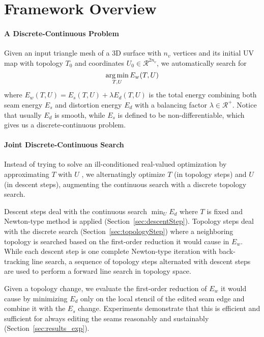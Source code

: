 
\section{Framework Overview}

\paragraph{A Discrete-Continuous Problem}

Given an input triangle mesh of a 3D surface with $n_v$ vertices and its initial UV map with topology $T_0$ and coordinates $U_0 \in \mathcal{R}^{2n_v}$, we automatically search for
\[ \operatorname*{arg\,min}_{T,U} E_w(T,U) \]
where $E_w(T,U) = E_s(T,U) + \lambda E_d(T,U)$ is the total energy combining both seam energy $E_s$ and distortion energy $E_d$ with a balancing factor $\lambda \in \mathcal{R^+}$. Notice that usually $E_d$ is smooth, while $E_s$ is defined to be non-differentiable, which gives us a discrete-continuous problem.

\paragraph{Joint Discrete-Continuous Search}

Instead of trying to solve an ill-conditioned real-valued optimization by approximating $T$ with $U$ \cite{Poranne2017Autocuts}, we alternatingly optimize $T$ (in topology steps) and $U$ (in descent steps), augmenting the continuous search with a discrete topology search.

Descent steps deal with the continuous search
$\min_U E_d$
where $T$ is fixed and Newton-type method is applied (Section~\ref{sec:descentStep}).
Topology steps deal with the discrete search (Section~\ref{sec:topologyStep}) where a neighboring topology is searched based on the first-order reduction it would cause in $E_w$.
While each descent step is one complete Newton-type iteration with back-tracking line search, a sequence of topology steps alternated with descent steps are used to perform a forward line search in topology space. 

Given a topology change, we evaluate the first-order reduction of $E_w$ it would cause by minimizing $E_d$ only on the local stencil of the edited seam edge and combine it with the $E_s$ change. Experiments demonstrate that this is efficient and sufficient for always editing the seams reasonably and sustainably (Section~\ref{sec:results_exp}).


